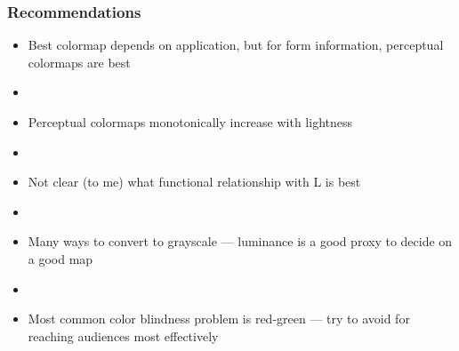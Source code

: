 \documentclass[ignorenonframetext]{beamer}
\begin{document}

\begin{frame}[c]\frametitle{Recommendations}
\begin{itemize}
    \item Best colormap depends on application, but for form information, perceptual colormaps are best
    \item[] ~
    \item Perceptual colormaps monotonically increase with lightness
    \item[] ~
    \item Not clear (to me) what functional relationship with L is best
    \item[] ~
    \item Many ways to convert to grayscale --- luminance is a good proxy to decide on a good map
    \item[] ~
    \item Most common color blindness problem is red-green --- try to avoid for reaching audiences most effectively
\end{itemize}
\end{frame}
\end{document}
